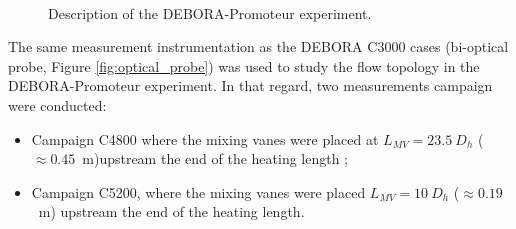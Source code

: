 \begin{figure}[!h]
\newlength\imageheight
\centering
{}
\\
\caption{Description of the DEBORA-Promoteur experiment.}
\label{fig:debprom_description}
\end{figure}


The same measurement instrumentation as the DEBORA C3000 cases   (bi-optical probe, Figure \ref{fig:optical_probe}) was used to study the flow topology in the DEBORA-Promoteur experiment. In that regard, two measurements campaign were conducted:

\begin{itemize}
\item Campaign C4800 where the mixing vanes were placed at $L_{MV} = 23.5\ D_{h}$ ($\approx 0.45$\ m)upstream the end of the heating length ;
\item Campaign C5200, where the mixing vanes were placed $L_{MV} = 10\ D_{h}$ ($\approx 0.19$\ m) upstream the end of the heating length.
\end{itemize}

